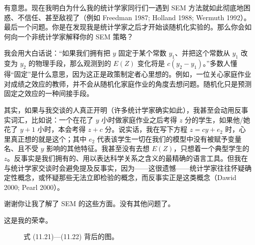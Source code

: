 有意思。现在我明白为什么我的统计学家同行们一遇到 SEM 方法就如此彻底地困惑、不信任、甚至敌视了（例如 Freedman 1987; Holland 1988; Wermuth 1992）。最后一个问题。你是在发现我是统计学家之后才开始谈随机化实验的。那么你会如何向一个非统计学家解释你的 SEM 策略？

我会用大白话说：“如果我们拥有把 $y$ 固定于某个常数 $y_1$、并把这个常数从 $y_1$ 改变为 $y_2$ 的物理手段，那么观测到的 $E(Z)$ 变化将是 $c(y_2-y_1)$。”多数人懂得“固定”是什么意思，因为这正是政策制定者心里想的。例如，一位关心家庭作业对成绩之效应的教师，并不会从随机化家庭作业的角度去想问题。随机化只是预测固定之效应的一种间接手段。

其实，如果与我交谈的人真正开明（许多统计学家确实如此），我甚至会动用反事实词汇，比如说：一个在花了 $y$ 小时做家庭作业之后考得 $z$ 分的学生，如果他/她花了 $y+1$ 小时，本会考得 $z+c$ 分。说实话，我在写下方程 $z=cy+e_2$ 时，心里真正想的就是这个；其中 $e_2$ 代表该学生一切在我们的模型中没有被赋予变量名、且不受 $y$ 影响的其他特征。我甚至没有去想 $E(Z)$，只想着一个典型学生的 $z$。反事实是我们拥有的、用以表达科学关系之含义的最精确的语言工具。但我在与统计学家交谈时会避免提及反事实，因为——这很遗憾——统计学家往往怀疑确定性概念，或怀疑那些无法立即检验的概念，而反事实正是这类概念（Dawid 2000; Pearl 2000）。

谢谢你让我了解了 SEM 的这些方面。没有其他问题了。

这是我的荣幸。

\begin{figure}[htbp]
\centering
{}
\caption{式 \textup{(11.21)}—\textup{(11.22)} 背后的图。}
\label{fig:11.14}
\end{figure}

